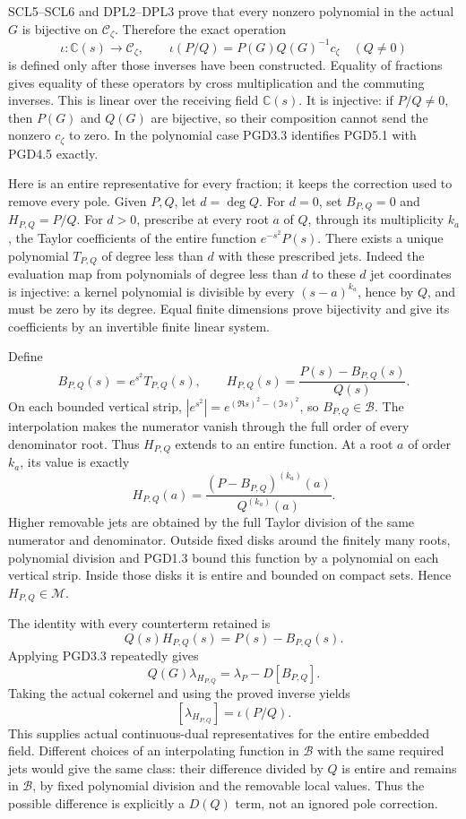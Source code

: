 SCL5--SCL6 and DPL2--DPL3 prove that every nonzero polynomial in the
actual \(G\) is bijective on \(\mathcal C_\zeta\). Therefore the exact
operation \[
\iota:\mathbb C(s)\longrightarrow\mathcal C_\zeta,\qquad
\iota(P/Q)=P(G)Q(G)^{-1}c_\zeta\quad(Q\ne0)
\tag{PGD5.1}
\] is defined only after those inverses have been constructed. Equality
of fractions gives equality of these operators by cross multiplication
and the commuting inverses. This is linear over the receiving field
\(\mathbb C(s)\). It is injective: if \(P/Q\ne0\), then \(P(G)\) and
\(Q(G)\) are bijective, so their composition cannot send the nonzero
\(c_\zeta\) to zero. In the polynomial case PGD3.3 identifies PGD5.1
with PGD4.5 exactly.

Here is an entire representative for every fraction; it keeps the
correction used to remove every pole. Given \(P,Q\), let \(d=\deg Q\).
For \(d=0\), set \(B_{P,Q}=0\) and \(H_{P,Q}=P/Q\). For \(d>0\),
prescribe at every root \(a\) of \(Q\), through its multiplicity
\(k_a\), the Taylor coefficients of the entire function
\(e^{-s^2}P(s)\). There exists a unique polynomial \(T_{P,Q}\) of degree
less than \(d\) with these prescribed jets. Indeed the evaluation map
from polynomials of degree less than \(d\) to these \(d\) jet
coordinates is injective: a kernel polynomial is divisible by every
\((s-a)^{k_a}\), hence by \(Q\), and must be zero by its degree. Equal
finite dimensions prove bijectivity and give its coefficients by an
invertible finite linear system.

Define \[
B_{P,Q}(s)=e^{s^2}T_{P,Q}(s),\qquad
H_{P,Q}(s)=\frac{P(s)-B_{P,Q}(s)}{Q(s)}.
\tag{PGD5.2}
\] On each bounded vertical strip,
\(|e^{s^2}|=e^{(\Re s)^2-(\Im s)^2}\), so \(B_{P,Q}\in\mathcal B\). The
interpolation makes the numerator vanish through the full order of every
denominator root. Thus \(H_{P,Q}\) extends to an entire function. At a
root \(a\) of order \(k_a\), its value is exactly \[
H_{P,Q}(a)=\frac{(P-B_{P,Q})^{(k_a)}(a)}{Q^{(k_a)}(a)}.
\tag{PGD5.3}
\] Higher removable jets are obtained by the full Taylor division of the
same numerator and denominator. Outside fixed disks around the finitely
many roots, polynomial division and PGD1.3 bound this function by a
polynomial on each vertical strip. Inside those disks it is entire and
bounded on compact sets. Hence \(H_{P,Q}\in\mathcal M\).

The identity with every counterterm retained is \[
Q(s)H_{P,Q}(s)=P(s)-B_{P,Q}(s).
\] Applying PGD3.3 repeatedly gives \[
Q(G)\lambda_{H_{P,Q}}=\lambda_P-D[B_{P,Q}].
\tag{PGD5.4}
\] Taking the actual cokernel and using the proved inverse yields \[
\boxed{[\lambda_{H_{P,Q}}]=\iota(P/Q).}
\tag{PGD5.5}
\] This supplies actual continuous-dual representatives for the entire
embedded field. Different choices of an interpolating function in
\(\mathcal B\) with the same required jets would give the same class:
their difference divided by \(Q\) is entire and remains in
\(\mathcal B\), by fixed polynomial division and the removable local
values. Thus the possible difference is explicitly a \(D(Q)\) term, not
an ignored pole correction.


